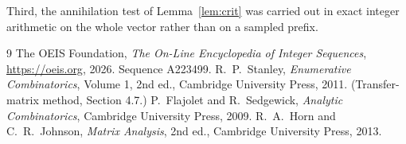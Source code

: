 \documentclass[11pt,a4paper]{article}
\theoremstyle{plain}
\theoremstyle{definition}
\begin{document}
Third, the annihilation test of Lemma~\ref{lem:crit} was carried out in exact integer
arithmetic on the whole vector rather than on a sampled prefix.

\begin{thebibliography}{9}
 The OEIS Foundation, \emph{The On-Line Encyclopedia of Integer
Sequences}, \url{https://oeis.org}, 2026. Sequence A223499.
 R.~P.~Stanley, \emph{Enumerative Combinatorics}, Volume 1, 2nd ed.,
Cambridge University Press, 2011. (Transfer-matrix method, Section 4.7.)
 P.~Flajolet and R.~Sedgewick, \emph{Analytic Combinatorics}, Cambridge
University Press, 2009.
 R.~A.~Horn and C.~R.~Johnson, \emph{Matrix Analysis}, 2nd ed., Cambridge
University Press, 2013.
\end{thebibliography}
\end{document}
